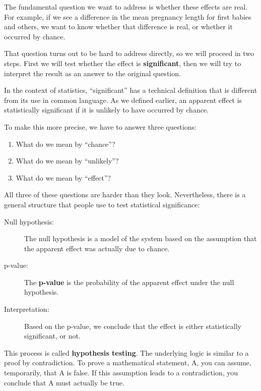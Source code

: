 \documentclass[12pt]{book}
\begin{document}
The fundamental question we want to address is whether these effects
are real.  For example, if we see a difference in the mean pregnancy
length for first babies and others, we want to know whether that
difference is real, or whether it occurred by chance.

That question turns out to be hard to address directly, so we will
proceed in two steps.  First we will test whether the effect is {\bf
  significant}, then we will try to interpret the result
  as an answer to the original question.

In the context of statistics, ``significant'' has a technical
definition that is different from its use in common language.
As we defined earlier, an apparent effect is statistically
significant if it is unlikely to have occurred by chance.

To make this more precise, we have to answer three questions:

\begin{enumerate}

\item What do we mean by ``chance''?

\item What do we mean by ``unlikely''?

\item What do we mean by ``effect''?

\end{enumerate}

All three of these questions are harder than they look.  Nevertheless,
there is a general structure that people use to test statistical
significance:

\begin{description}

\item[Null hypothesis:] The null hypothesis is a model of the system
  based on the assumption that the apparent effect was actually due to
  chance.

\item[p-value:] The {\bf p-value} is the probability of the apparent
  effect under the null hypothesis.

\item[Interpretation:] Based on the p-value, we conclude that the
  effect is either statistically significant, or not.

\end{description}

This process is called {\bf hypothesis testing}.  The underlying
logic is similar to a proof by contradiction.  To prove a mathematical
statement, A, you can assume, temporarily, that A is false.  If this
assumption leads to a contradiction, you conclude that A must actually
be true.
\end{document}
